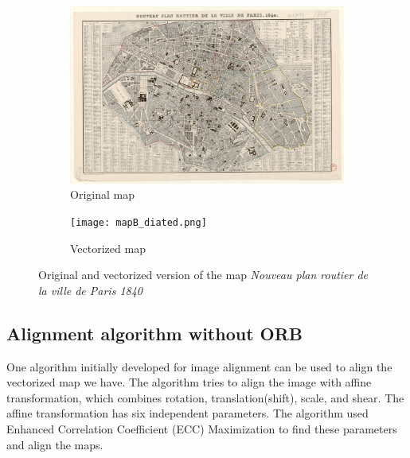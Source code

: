 \begin{figure}[h!]
     \centering
     \begin{subfigure}{0.48\textwidth}
         \centering
         \includegraphics[width=\textwidth]{Images/mapB_native_screenshot.png}
         \caption{Original map}
         \label{compare::a}
     \end{subfigure}
     \hfill
     \begin{subfigure}{0.48\textwidth}
         \centering
         \texttt{[image: mapB\_diated.png]}
         \caption{Vectorized map}
         \label{compare::b}
     \end{subfigure}
        \caption{Original and vectorized version of the map \textit{Nouveau plan routier de la ville de Paris 1840}}
        \label{compare2}
\end{figure}


\subsection{Alignment algorithm without ORB \cite{opencv_library}} 
One algorithm initially developed for image alignment \cite{mallick_2015_image} can be used to align the vectorized map we have. The algorithm tries to align the image with affine transformation, which combines rotation, translation(shift), scale, and shear. The affine transformation has six independent parameters. The algorithm used Enhanced Correlation Coefficient (ECC) Maximization \cite{mallick_2015_image} to find these parameters and align the maps.

